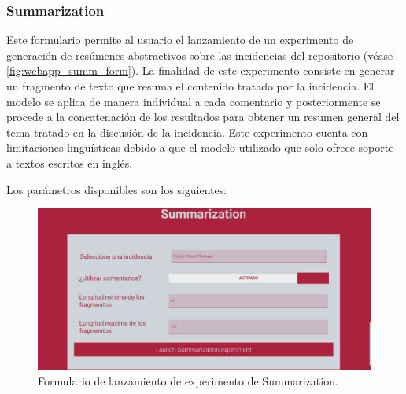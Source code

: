 \subsubsection{Summarization}

Este formulario permite al usuario el lanzamiento de un experimento de generación de resúmenes abstractivos sobre las incidencias del repositorio (véase \autoref{fig:webapp_summ_form}). La finalidad de este experimento consiste en generar un fragmento de texto que resuma el contenido tratado por la incidencia. El modelo se aplica de manera individual a cada comentario y posteriormente se procede a la concatenación de los resultados para obtener un resumen general del tema tratado en la discusión de la incidencia. Este experimento cuenta con limitaciones lingüísticas debido a que el modelo utilizado que solo ofrece soporte a textos escritos en inglés.

Los parámetros disponibles son los siguientes:

\begin{figure}[!ht]
	\centering
    \includegraphics[width=\textwidth]{img/webapp_summ_form.png}
	\caption{Formulario de lanzamiento de experimento de Summarization.}
	\label{fig:webapp_summ_form}
\end{figure}

